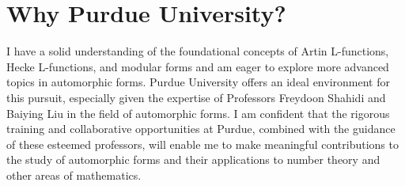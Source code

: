 \documentclass[12pt]{article}
\theoremstyle{definition}
\begin{document}
\section{Why Purdue University?}
I have a solid understanding of the foundational concepts of Artin L-functions, Hecke L-functions, and modular forms and am eager to explore more advanced topics in automorphic forms. Purdue University offers an ideal environment for this pursuit, especially given the expertise of Professors Freydoon Shahidi and Baiying Liu in the field of automorphic forms. I am confident that the rigorous training and collaborative opportunities at Purdue, combined with the guidance of these esteemed professors, will enable me to make meaningful contributions to the study of automorphic forms and their 
applications to number theory and other areas of mathematics.
\end{document}
